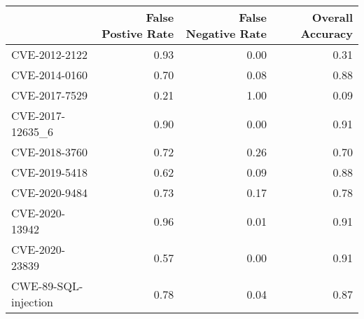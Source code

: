\begin{tabular}{lrrr}
\toprule
{} &  False Postive Rate &  False Negative Rate &  Overall Accuracy \\
\midrule
CVE-2012-2122        &                0.93 &                 0.00 &              0.31 \\
CVE-2014-0160        &                0.70 &                 0.08 &              0.88 \\
CVE-2017-7529        &                0.21 &                 1.00 &              0.09 \\
CVE-2017-12635\_6     &                0.90 &                 0.00 &              0.91 \\
CVE-2018-3760        &                0.72 &                 0.26 &              0.70 \\
CVE-2019-5418        &                0.62 &                 0.09 &              0.88 \\
CVE-2020-9484        &                0.73 &                 0.17 &              0.78 \\
CVE-2020-13942       &                0.96 &                 0.01 &              0.91 \\
CVE-2020-23839       &                0.57 &                 0.00 &              0.91 \\
CWE-89-SQL-injection &                0.78 &                 0.04 &              0.87 \\
\bottomrule
\end{tabular}
